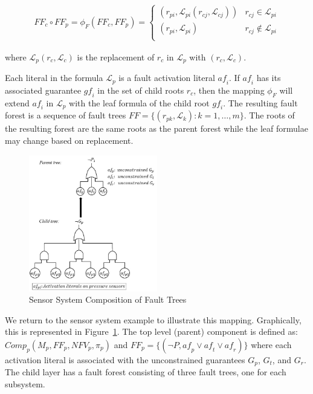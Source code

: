 \begin{gather}
\mathit{FF}_c \circ \mathit{FF}_p = \phi_F(\mathit{FF}_c, \mathit{FF}_p) =\begin{cases} 
      (r_{pi}, \mathcal{L}_{pi}(r_{cj}, \mathcal{L}_{cj})) & r_{cj} \in \mathcal{L}_{pi} \\
      (r_{pi}, \mathcal{L}_{pi}) & r_{cj} \not\in \mathcal{L}_{pi} \\
   \end{cases}
\end{gather}

where $\mathcal{L}_p(r_c, \mathcal{L}_c)$ is the replacement of $r_c$ in $\mathcal{L}_p$ with $(r_c, \mathcal{L}_c)$.

Each literal in the formula $\mathcal{L}_p$ is a fault activation literal $\mathit{af_i}$. If $\mathit{af_i}$ has its associated guarantee $\mathit{gf_i}$ in the set of child roots $r_c$, then the mapping $\phi_F$ will extend $\mathit{af_i}$ in $\mathcal{L}_p$ with the leaf formula of the child root $\mathit{gf_i}$.  The resulting fault forest is a sequence of fault trees $\mathit{FF} = \{(r_{pk}, \mathcal{L}_{k}): k = 1,\dots,m\}$. The roots of the resulting forest are the same roots as  the parent forest while the leaf formulae may change based on replacement. 



\begin{figure}[h!]
	\begin{center}
		\includegraphics[width=0.5\textwidth]{images/faultCompEx.JPG}
	\end{center}
	\caption{Sensor System Composition of Fault Trees}
	\label{fig:sensorSysComp}
\end{figure}
We return to the sensor system example to illustrate this mapping. Graphically, this is represented in Figure~\ref{fig:sensorSysComp}.  The top level (parent) component is defined as: $\mathit{Comp}_p (M_p, \mathit{FF}_p, \mathit{NFV}_p, \pi_p)$ and $\mathit{FF}_p = \{(\neg P, \mathit{af}_p \lor \mathit{af}_t \lor \mathit{af}_r)\}$ where each activation literal is associated with the unconstrained guarantees $G_p$, $G_t$, and $G_r$. The child layer has a fault forest consisting of three fault trees, one for each subsystem. 

